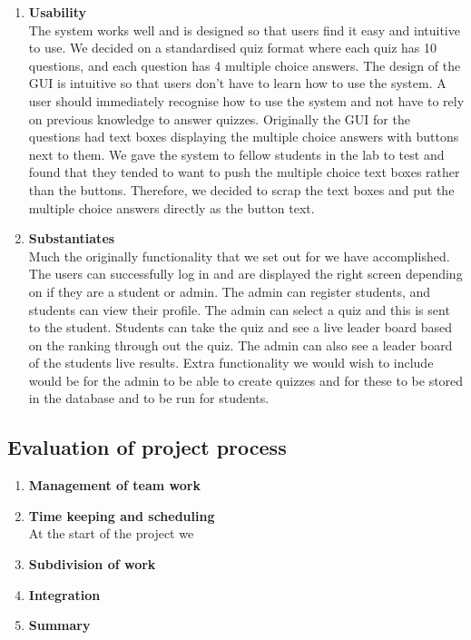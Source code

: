 \begin{enumerate}
	\item \textbf{Usability} \\
		The system works well and is designed so that users find it easy and intuitive to use.
		We decided on a standardised quiz format where each quiz has 10 questions, and each question
		has 4 multiple choice answers. The design of the GUI is intuitive so that users don't
		have to learn how to use the system. A user should immediately recognise how to use the
		system and not have to rely on previous knowledge to answer quizzes. Originally the GUI for 
		the questions had text boxes displaying the multiple choice answers with buttons next to
		them. We gave the system to fellow students in the lab to test and found that they tended
		to want to push the multiple choice text boxes rather than the buttons. Therefore, we decided
		to scrap the text boxes and put the multiple choice answers directly as the button text.
	
	\item \textbf{Substantiates} \\
		Much the originally functionality that we set out for we have accomplished.
		The users can successfully log in and are displayed the right screen depending
		on if they are a student or admin. The admin can register students, and
		students can view their profile. The admin can select a quiz and this is
		sent to the student. Students can take the quiz and see a live leader board
		based on the ranking through out the quiz. The admin can also see a leader
		board of the students live results. Extra functionality we would wish to include
		would be for the admin to be able to create quizzes and for these to be stored in
		the database and to be run for students.

\end{enumerate}

\subsection{Evaluation of project process}
\label{sub:evaluation_of_project_process}

\begin{enumerate}

	\item \textbf{Management of team work} \\

	\item \textbf{Time keeping and scheduling} \\
		At the start of the project we 
	
	\item \textbf{Subdivision of work} \\

	\item \textbf{Integration} \\

	\item \textbf{Summary} \\
 
\end{enumerate}
